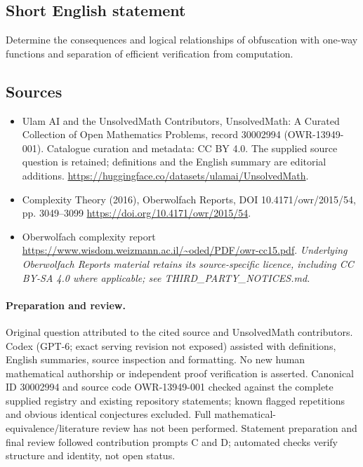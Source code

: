 \documentclass[11pt]{article}
\begin{document}
\subsection{Short English statement}
Determine the consequences and logical relationships of obfuscation with one-way functions and separation of efficient verification from computation.
\subsection{Sources}
\begin{itemize}
\item[\hypertarget{source:30002994:1}{S1}] Ulam AI and the UnsolvedMath Contributors, UnsolvedMath: A Curated Collection of Open Mathematics Problems, record 30002994 (OWR-13949-001). Catalogue curation and metadata: CC BY 4.0. The supplied source question is retained; definitions and the English summary are editorial additions.
\url{https://huggingface.co/datasets/ulamai/UnsolvedMath}.
\item[\hypertarget{source:30002994:2}{S2}] Complexity Theory (2016), Oberwolfach Reports, DOI 10.4171/owr/2015/54, pp. 3049--3099
\url{https://doi.org/10.4171/owr/2015/54}.
\item[\hypertarget{source:30002994:3}{S3}] Oberwolfach complexity report
\url{https://www.wisdom.weizmann.ac.il/~oded/PDF/owr-cc15.pdf}.
\textit{Underlying Oberwolfach Reports material retains its source-specific licence, including CC BY-SA 4.0 where applicable; see THIRD\_PARTY\_NOTICES.md.}
\end{itemize}
\paragraph{Preparation and review.}
Original question attributed to the cited source and UnsolvedMath contributors. Codex (GPT-6; exact serving revision not exposed) assisted with definitions, English summaries, source inspection and formatting. No new human mathematical authorship or independent proof verification is asserted. Canonical ID 30002994 and source code OWR-13949-001 checked against the complete supplied registry and existing repository statements; known flagged repetitions and obvious identical conjectures excluded. Full mathematical-equivalence/literature review has not been performed. Statement preparation and final review followed contribution prompts C and D; automated checks verify structure and identity, not open status.
\label{end:30002994}
\end{document}

